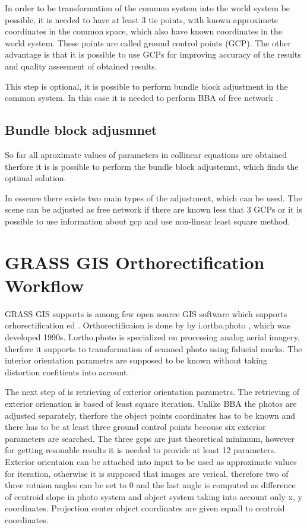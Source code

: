 \documentclass[a4paper,12pt]{report}
\begin{document}
In order to be transformation of the common system into the world system be possible, it is needed 
to have at least 3 tie points, with known approximete coordinates in the common space, which also have 
known coordinates in the world system. These points are called ground control points (GCP). The other advantage is that it is possible to use GCPs for improving accuracy of the results and 
 quality assesment of obtained results.
 
This step is optional, it is possible to perform bundle block adjustment in the common system. In this 
case it is needed to perform BBA of free network \label{sec:free_net_least}. 
 
 
\subsection{Bundle block adjusmnet}

So far all aproximate values of parameters in collinear equations are obtained therfore it 
is is possible to perform the bundle block adjustemnt, which finds the optimal solution.

In essence there exists two main types of the adjustment, which can be used. The scene 
can be adjusted as free network if there are known less that 3 GCPs or it is possible 
to use information about gcp and use non-linear least square method.

\section{GRASS GIS Orthorectification Workflow}

GRASS GIS supports is among few open source GIS software which supports orhorectification ed
\cite{rocchini2012robust}. Orthorectificaion is done by 
by i.ortho.photo \cite{i.ortho.photo}, which was developed 1990s.
I.ortho.photo is specialized on processing analog aerial imagery, therfore 
it supports to transformation of scanned photo using fiducial marks. 
The interior orientation parametrs are supposed to be known without taking distortion 
coefitients into account. 

The next step of is retrieving of exterior orientation parametrs. The retrieving 
of exterior orienation is based of least square iteration. Unlike BBA
the photos are adjusted separately, therfore the object points coordinates has to be known
and there has to be at least three ground control points becouse six exterior parameters are 
searched. The three gcps are just theoretical minimum, however for getting resonable 
results it is needed to provide at least 12 parameters. Exterior orientaion 
can be attached into input to be used as approximate values for iteration,
otherwise it is supposed that images are verical, therefore two of three rotaion
angles can be set to 0 and the last angle is computed as difference of centroid slope
in photo system and object system taking into account only x, y coordinates.
Projection center object coordinates are given equall to centroid coordinates.
\end{document}
